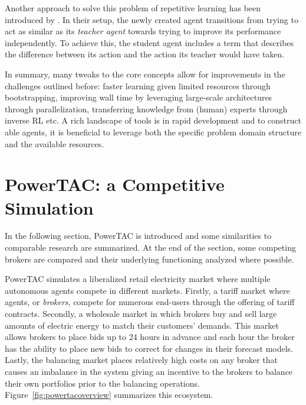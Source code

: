 Another approach to solve this problem of repetitive learning has been introduced by \citet{schmitt2018kickstarting}. In
their setup, the newly created agent transitions from trying to act as similar as its \emph{teacher agent} towards trying
to improve its performance independently. To achieve this, the student agent includes a term that describes the
difference between its action and the action its teacher would have taken.

In summary, many tweaks to the core concepts allow for improvements in the challenges outlined before: faster learning given limited
resources through bootstrapping, improving wall time by leveraging large-scale architectures through
parallelization, transferring knowledge from (human) experts through inverse \ac{RL} etc. A rich landscape of tools is
in rapid development and to construct able agents, it is beneficial to leverage both the specific problem domain
structure and the available resources.


\section{PowerTAC: a Competitive Simulation}%
\label{sec:powertac_a_competitive_simulation}


In the following section, \acl{PowerTAC} is introduced and some similarities to comparable
research are summarized. At the end of the section, some competing brokers are compared and their underlying
functioning analyzed where possible.

\ac{PowerTAC} simulates a liberalized retail electricity market where multiple autonomous agents compete in
different markets. Firstly, a tariff market where agents, or \emph{brokers}, compete for numerous end-users through the
offering of tariff contracts. Secondly, a wholesale market in which brokers buy and sell large amounts of electric
energy to match their customers' demands. This market allows brokers to place bids up to 24 hours in advance and each
hour the broker has the ability to place new bids to correct for changes in their forecast models. Lastly, the balancing
market places relatively high costs on any broker that causes an imbalance in the system giving an incentive to the
brokers to balance their own portfolios prior to the balancing operations. Figure~\ref{fig:powertacoverview} summarizes
this ecosystem.

